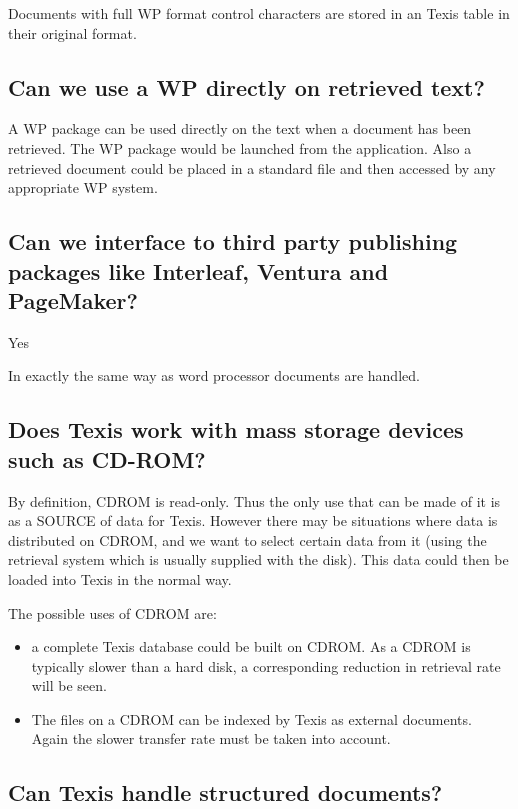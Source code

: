 Documents with full WP format control characters are stored in an Texis
table in their original format.

\subsection{Can we use a WP directly on retrieved text?}

A WP package can be used directly on the text when a document has been
retrieved. The WP package would be launched from the application. Also a
retrieved document could be placed in a standard file and then accessed by any
appropriate WP system.

\subsection{Can we interface to third party publishing packages like Interleaf, Ventura and
PageMaker?}

Yes

In exactly the same way as word processor documents are handled.

\subsection{Does Texis work with mass storage devices such as CD-ROM?}

By definition, CDROM is read-only.  Thus the only use that can be made of
it is as a SOURCE of data for Texis.  However there may be situations
where data is distributed on CDROM, and we want to select certain data
from it (using the retrieval system which is usually supplied with the
disk).  This data could then be loaded into Texis in the normal way.

The possible uses of CDROM are:
\begin{itemize}
 \item  a complete Texis database could be built on CDROM.  As a CDROM
is typically slower than a hard disk, a corresponding reduction in
retrieval rate will be seen.

 \item  The files on a CDROM can be indexed by Texis as external
documents.  Again the slower transfer rate must be taken into account.
\end{itemize}

\subsection{Can Texis handle structured documents?}

